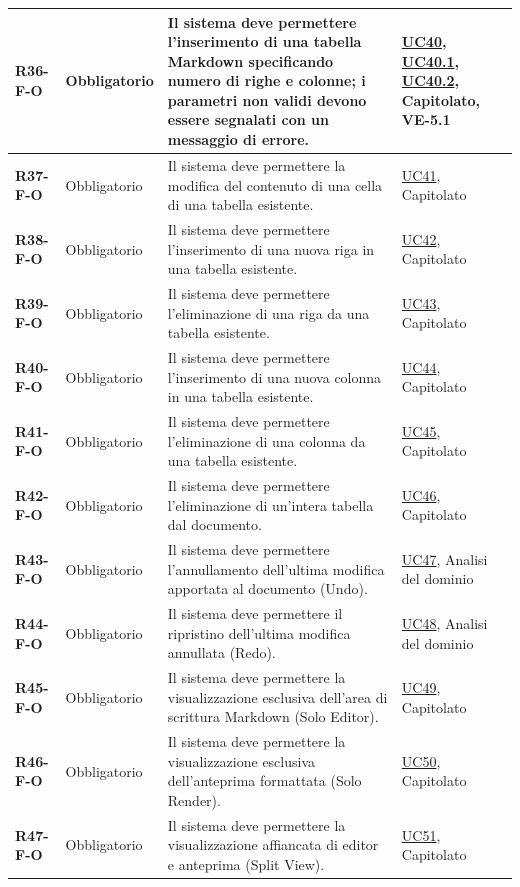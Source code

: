 \begin{longtable}{|p{2.5cm}|p{2.2cm}|p{6.8cm}|p{2.7cm}|}
	\textbf{R36-F-O} & Obbligatorio & Il sistema deve permettere l'inserimento di una tabella Markdown specificando numero di righe e colonne; i parametri non validi devono essere segnalati con un messaggio di errore. & \hyperlink{uc40}{UC40}, \hyperlink{uc40.1}{UC40.1}, \hyperlink{uc40.2}{UC40.2}, Capitolato, VE-5.1 \\ \hline
	\textbf{R37-F-O} & Obbligatorio & Il sistema deve permettere la modifica del contenuto di una cella di una tabella esistente. & \hyperlink{uc41}{UC41}, Capitolato \\ \hline
	\textbf{R38-F-O} & Obbligatorio & Il sistema deve permettere l'inserimento di una nuova riga in una tabella esistente. & \hyperlink{uc42}{UC42}, Capitolato \\ \hline
	\textbf{R39-F-O} & Obbligatorio & Il sistema deve permettere l'eliminazione di una riga da una tabella esistente. & \hyperlink{uc43}{UC43}, Capitolato \\ \hline
	\textbf{R40-F-O} & Obbligatorio & Il sistema deve permettere l'inserimento di una nuova colonna in una tabella esistente. & \hyperlink{uc44}{UC44}, Capitolato \\ \hline
	\textbf{R41-F-O} & Obbligatorio & Il sistema deve permettere l'eliminazione di una colonna da una tabella esistente. & \hyperlink{uc45}{UC45}, Capitolato \\ \hline
	\textbf{R42-F-O} & Obbligatorio & Il sistema deve permettere l'eliminazione di un'intera tabella dal documento. & \hyperlink{uc46}{UC46}, Capitolato \\ \hline

	\textbf{R43-F-O} & Obbligatorio & Il sistema deve permettere l'annullamento dell'ultima modifica apportata al documento (Undo). & \hyperlink{uc47}{UC47}, Analisi del dominio \\ \hline
	\textbf{R44-F-O} & Obbligatorio & Il sistema deve permettere il ripristino dell'ultima modifica annullata (Redo). & \hyperlink{uc48}{UC48}, Analisi del dominio \\ \hline

	\textbf{R45-F-O} & Obbligatorio & Il sistema deve permettere la visualizzazione esclusiva dell'area di scrittura Markdown (Solo Editor). & \hyperlink{uc49}{UC49}, Capitolato \\ \hline
	\textbf{R46-F-O} & Obbligatorio & Il sistema deve permettere la visualizzazione esclusiva dell'anteprima formattata (Solo Render). & \hyperlink{uc50}{UC50}, Capitolato \\ \hline
	\textbf{R47-F-O} & Obbligatorio & Il sistema deve permettere la visualizzazione affiancata di editor e anteprima (Split View). & \hyperlink{uc51}{UC51}, Capitolato \\ \hline


\end{longtable}
